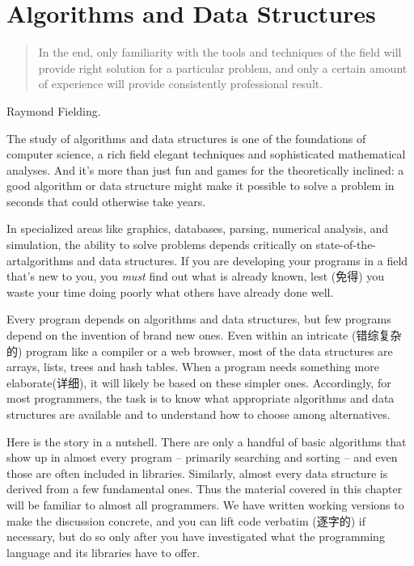 \chapter{Algorithms and Data Structures}
\label{chap:alds}
\begin{quote}
    In the end, only familiarity with the tools and techniques of the field
    will provide right solution for a particular problem, and only a
    certain amount of experience will provide consistently professional
    result.
\end{quote}
\begin{quotesrc}
    Raymond Fielding.
\end{quotesrc}
The study of algorithms and data structures is one of the foundations of
computer science, a rich field elegant techniques and sophisticated
mathematical analyses. And it's more than just fun and games for the
theoretically inclined: a good algorithm or data structure might make it
possible to solve a problem in seconds that could otherwise take years.

In specialized areas like graphics, databases, parsing, numerical analysis,
and simulation, the ability to solve problems depends critically on
state-of-the-artalgorithms and data structures. If you are developing your
programs in a field that's new to you, you \textit{must} find out what is
already known, lest (免得) you waste your time doing poorly what others have
already done well.

Every program depends on algorithms and data structures, but few programs
depend on the invention of brand new ones. Even within an intricate
(错综复杂的) program like a compiler or a web browser, most of the data
structures are arrays, lists, trees and hash tables. When a program needs
something more elaborate(详细), it will likely be based on these simpler
ones. Accordingly, for most programmers, the task is to know what
appropriate algorithms and data structures are available and to understand
how to choose among alternatives.

Here is the story in a nutshell. There are only a handful of basic
algorithms that show up in almost every program -- primarily searching and
sorting -- and even those are often included in libraries. Similarly,
almost every data structure is derived from a few fundamental ones. Thus
the material covered in this chapter will be familiar to almost all
programmers. We have written working versions to make the discussion
concrete, and you can lift code verbatim (逐字的) if necessary, but do so
only after you have investigated what the programming language and its
libraries have to offer.

